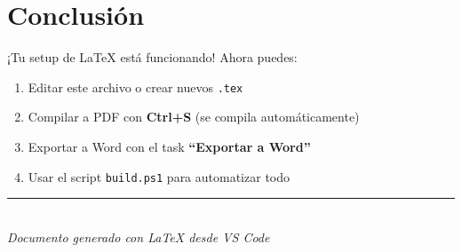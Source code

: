 \documentclass[12pt, a4paper]{article}
\begin{document}
\section{Conclusión}

¡Tu setup de \LaTeX{} está funcionando! Ahora puedes:

\begin{enumerate}
    \item Editar este archivo o crear nuevos \texttt{.tex}
    \item Compilar a PDF con \textbf{Ctrl+S} (se compila automáticamente)
    \item Exportar a Word con el task \textbf{``Exportar a Word''}
    \item Usar el script \texttt{build.ps1} para automatizar todo
\end{enumerate}

\vfill
\begin{center}
    \rule{0.5\textwidth}{0.4pt}\\[0.5em]
    \textit{Documento generado con \LaTeX{} desde VS Code}
\end{center}
\end{document}

